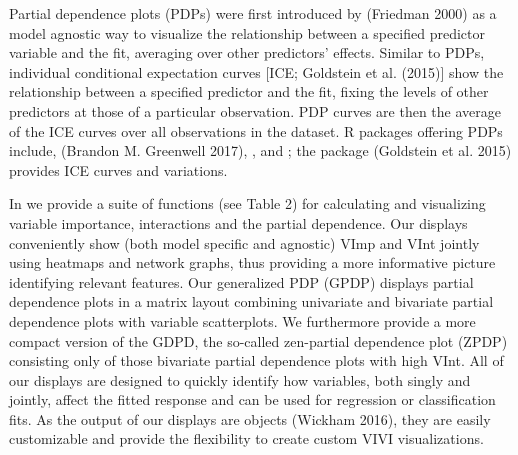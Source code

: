 Partial dependence plots (PDPs) were first introduced by (Friedman 2000) as
a model agnostic way to visualize the relationship between a specified
predictor variable and the fit, averaging over other predictors'
effects. Similar to PDPs, individual conditional expectation curves
{[}ICE; Goldstein et al. (2015){]} show the relationship between a specified predictor and the
fit, fixing the levels of other predictors at those of a particular
observation. PDP curves are then the average of the ICE curves over all
observations in the dataset. R packages offering PDPs include,  (Brandon M. Greenwell 2017),
, and ; the package  (Goldstein et al. 2015) provides ICE curves and variations.

In  we provide a suite of functions (see Table 2) for calculating and visualizing variable importance, interactions and the partial dependence. Our displays conveniently show
(both model specific and agnostic) VImp and VInt jointly using heatmaps and network graphs, thus providing a more informative picture identifying relevant features. Our generalized PDP (GPDP) displays partial dependence plots in a matrix layout combining univariate and bivariate partial dependence plots with variable scatterplots. We furthermore provide a more compact version of the GDPD, the so-called zen-partial dependence plot (ZPDP) consisting only of those bivariate partial dependence plots with high VInt. All of our displays are designed to quickly identify how variables, both singly and jointly, affect the fitted response and can be used for regression or classification fits. As the output of our displays are  objects (Wickham 2016), they are easily customizable and provide the flexibility to create custom VIVI visualizations.

